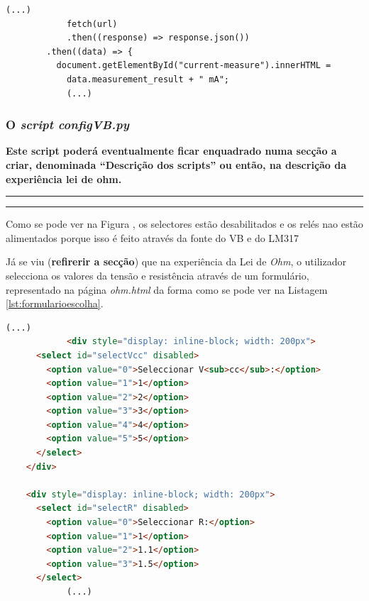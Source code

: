 \begin{center}
	\begin{minipage}{0.7\linewidth}
		\begin{lstlisting}[language=html, caption=Recepção de resultados na página \textit{ohm.html}, label=lst:recepcaoresultados]
			(...)
			fetch(url)
			.then((response) => response.json())
		.then((data) => {
		  document.getElementById("current-measure").innerHTML =
			data.measurement_result + " mA";
			(...)
			\end{lstlisting}
	\end{minipage}
\end{center}

\subsubsection{O \textit{script configVB.py}}
\textbf{Este script poderá eventualmente ficar enquadrado numa secção a criar, denominada ``Descrição dos scripts'' ou então, na descrição da experiência lei de ohm.}

\hrule
\hrule

Como se pode ver na Figura , os selectores estão desabilitados e os relés nao estão alimentados porque isso é feito através da fonte do VB e do LM317

Já se viu (\textbf{refirerir a secção}) que na experiência da Lei de \textit{Ohm}, o utilizador selecciona os valores da tensão e resistência através de um formulário, representado na página \textit{ohm.html} da forma como se pode ver na Listagem \ref{lst:formularioescolha}.

\begin{center}
	\begin{minipage}{0.7\linewidth}
		\begin{lstlisting}[language=html, caption=Formulário de escolha na página \textit{ohm.html},label=lst:formularioescolha]
			(...)
			<div style="display: inline-block; width: 200px">
      <select id="selectVcc" disabled>
        <option value="0">Seleccionar V<sub>cc</sub>:</option>
        <option value="1">1</option>
        <option value="2">2</option>
        <option value="3">3</option>
        <option value="4">4</option>
        <option value="5">5</option>
      </select>
    </div>

    <div style="display: inline-block; width: 200px">
      <select id="selectR" disabled>
        <option value="0">Seleccionar R:</option>
        <option value="1">1</option>
        <option value="2">1.1</option>
        <option value="3">1.5</option>
      </select>
			(...)
	\end{lstlisting}
	\end{minipage}
\end{center}

